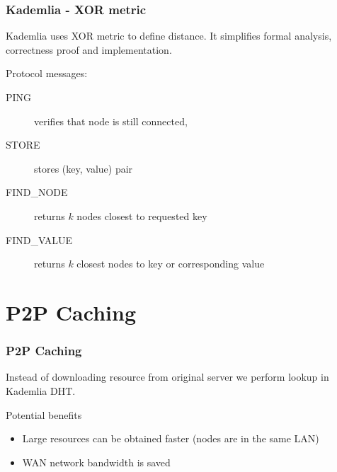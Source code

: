 \documentclass{beamer}
\begin{document}
\begin{frame}
\frametitle{Kademlia - XOR metric}

\begin{block}{}
Kademlia uses XOR metric to define distance. It simplifies formal analysis,
correctness proof and implementation.
\end{block}

\pause

\begin{block}{}
Protocol messages:
\begin{description}
\item[PING] verifies that node is still connected,
\item[STORE] stores (key, value) pair
\item[FIND\_NODE] returns $k$ nodes closest to requested key
\item[FIND\_VALUE] returns $k$ closest nodes to key or corresponding value
\end{description}
\end{block}

\end{frame}

\section{P2P Caching}
\begin{frame}
\frametitle{P2P Caching}

\begin{block}{}
Instead of downloading resource from original server we perform lookup
in Kademlia DHT.
\end{block}

\begin{block}{Potential benefits}
\begin{itemize}
  \item Large resources can be obtained faster (nodes are in the same LAN)
  \item WAN network bandwidth is saved
\end{itemize}
\end{block}

\end{frame}
\end{document}
